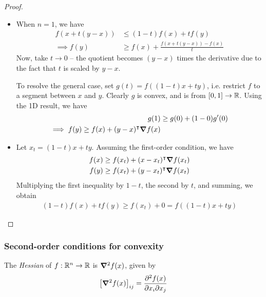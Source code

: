 \documentclass{../template/note}
\begin{document}
    \begin{proof}
        \begin{itemize}
            \item[$\implies$] When $n=1$, we have
            \begin{align*}
                f(x + t(y-x)) &\leq (1-t)f(x) + tf(y) \\
                \implies f(y) &\geq f(x) + \frac{f(x+t(y-x))-f(x)}{t}
            \end{align*}
            Now, take $t \to 0$ -- the quotient becomes $(y-x)$ times the derivative due to the fact that $t$ is scaled by $y-x$.

            To resolve the general case, set $g(t) = f((1-t)x+ty)$, i.e. restrict $f$ to a segment between $x$ and $y$. Clearly $g$ is convex, and is from $[0, 1] \to \mathbb R$. Using the 1D result, we have
            \begin{align*}
                g(1) &\geq g(0) + (1-0)g'(0) \\
                \implies f(y) \geq f(x) + (y-x)^\intercal \grad f(x)
            \end{align*}
            \item[$\impliedby$] Let $x_t = (1-t)x + ty$. Assuming the first-order condition, we have
            \begin{align*}
                f(x) &\geq f(x_t) + (x-x_t)^\intercal \grad f(x_t) \\
                f(y) &\geq f(x_t) + (y-x_t)^\intercal \grad f(x_t)
            \end{align*}
            Multiplying the first inequality by $1-t$, the second by $t$, and summing, we obtain
            \begin{align*}
                (1-t)f(x) + tf(y) \geq f(x_t) + 0 = f((1-t)x + ty)
            \end{align*}            
        \end{itemize}
    \end{proof}
    
    \subsubsection{Second-order conditions for convexity}

    \begin{definition}[Hessian]
        The \emph{Hessian} of $f: \mathbb R^n \to \mathbb R$ is $\grad^2 f(x)$, given by
        \begin{align*}
            \left[\grad^2 f(x)\right]_{ij} = \pd{^2f(x)}{x_i \pr x_j}
        \end{align*}
    \end{definition}
    
\end{document}
